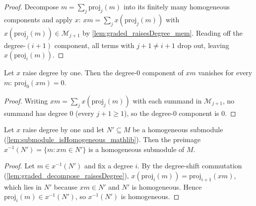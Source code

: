\begin{proof}
  \leanok
  Decompose \(m = \sum_j \mathrm{proj}_j(m)\) into its finitely many homogeneous
  components and apply \(x\): \(x m = \sum_j x(\mathrm{proj}_j(m))\) with
  \(x(\mathrm{proj}_j(m)) \in \mathcal{M}_{j+1}\) by
  \cref{lem:graded_raisesDegree_mem}. Reading off the degree-\((i+1)\) component, all
  terms with \(j+1 \ne i+1\) drop out, leaving \(x(\mathrm{proj}_i(m))\).
\end{proof}

\begin{lemma}\leanok
  \label{lem:graded_decompose_raisesDegree_zero}
  Let \(x\) raise degree by one. Then the degree-\(0\) component of \(x m\) vanishes
  for every \(m\): \(\mathrm{proj}_0(x m) = 0\).
\end{lemma}

\begin{proof}
  \leanok
  Writing \(x m = \sum_j x(\mathrm{proj}_j(m))\) with each summand in
  \(\mathcal{M}_{j+1}\), no summand has degree \(0\) (every \(j+1 \ge 1\)), so the
  degree-\(0\) component is \(0\).
\end{proof}

\begin{lemma}\leanok
  \label{lem:graded_comap_isHomogeneous}
  Let \(x\) raise degree by one and let \(N' \subseteq M\) be a homogeneous submodule
  (\cref{lem:submodule_isHomogeneous_mathlib}). Then the preimage \(x^{-1}(N') =
  \{m : x m \in N'\}\) is a homogeneous submodule of \(M\).
\end{lemma}

\begin{proof}
  \leanok
  Let \(m \in x^{-1}(N')\) and fix a degree \(i\). By the degree-shift commutation
  (\cref{lem:graded_decompose_raisesDegree}), \(x(\mathrm{proj}_i(m)) =
  \mathrm{proj}_{i+1}(x m)\), which lies in \(N'\) because \(x m \in N'\) and \(N'\)
  is homogeneous. Hence \(\mathrm{proj}_i(m) \in x^{-1}(N')\), so \(x^{-1}(N')\) is
  homogeneous.
\end{proof}

